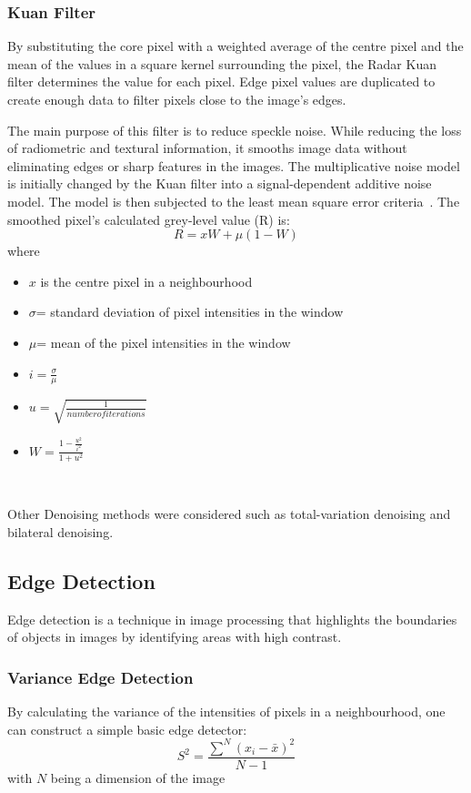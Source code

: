 \documentclass[a4paper, 12pt]{report}
\begin{document}
\subsubsection{Kuan Filter}
By substituting the core pixel with a weighted average of the centre pixel and
the mean of the values in a square kernel surrounding the pixel, the Radar Kuan
filter determines the value for each pixel. Edge pixel values are duplicated to
create enough data to filter pixels close to the image's edges.

The main purpose of this filter is to reduce speckle noise. While reducing the
loss of radiometric and textural information, it smooths image data without
eliminating edges or sharp features in the images. The multiplicative noise
model is initially changed by the Kuan filter into a signal-dependent additive
noise model. The model is then subjected to the least mean square error
criteria~\cite{kuan_filter_2022}. The smoothed pixel's calculated grey-level
value (R) is:
\[R=xW+\mu(1-W)\]
where
\begin{itemize}
    \item \(x\) is the centre pixel in a neighbourhood
    \item \(\sigma\)= standard deviation of pixel intensities in the window
    \item \(\mu\)= mean of the pixel intensities in the window
    \item \(i=\frac{\sigma}{\mu}\)
    \item \(u=\sqrt{\frac{1}{number of iterations}}\)
    \item \(W=\frac{1-\frac{u^2}{i^2}}{1+u^2}\)
\end{itemize}
~\cite{kuan_filter_2022}\par

Other Denoising methods were considered such as total-variation denoising and
bilateral denoising.

\subsection{Edge Detection}
Edge detection is a technique in image processing that highlights the
boundaries of objects in images by identifying areas with high contrast.

\subsubsection{Variance Edge Detection}
By calculating the variance of the intensities of pixels in a neighbourhood,
one can construct a simple basic edge detector:
\[S^2=\frac{\sum^N{(x_i-\bar{x})^2}}{N-1}\]
with $N$ being a dimension of the image
\end{document}

